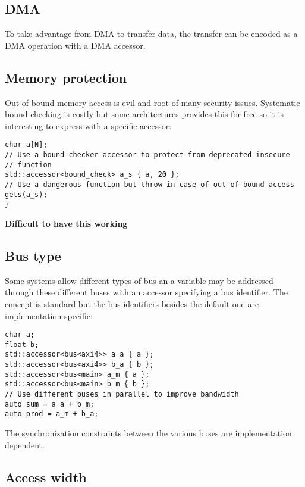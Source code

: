 \documentclass[a4paper]{article}
\begin{document}
\subsection{DMA}
\label{sec:dma}

To take advantage from DMA to transfer data, the transfer can be
encoded as a DMA operation with a DMA accessor.


\subsection{Memory protection}
\label{sec:memory-protection}

Out-of-bound memory access is evil and root of many security
issues. Systematic bound checking is costly but some architectures
provides this for free so it is interesting to express with a specific
accessor:
\begin{lstlisting}
char a[N];
// Use a bound-checker accessor to protect from deprecated insecure
// function
std::accessor<bound_check> a_s { a, 20 };
// Use a dangerous function but throw in case of out-of-bound access
gets(a_s);
}
\end{lstlisting}

\textbf{Difficult to have this working}


\subsection{Bus type}
\label{sec:bus-type}

Some systems allow different types of bus an a variable may be
addressed through these different buses with an accessor specifying a
bus identifier. The concept is standard but the bus identifiers
besides the default one are implementation specific:
\begin{lstlisting}
char a;
float b;
std::accessor<bus<axi4>> a_a { a };
std::accessor<bus<axi4>> b_a { b };
std::accessor<bus<main> a_m { a };
std::accessor<bus<main> b_m { b };
// Use different buses in parallel to improve bandwidth
auto sum = a_a + b_m;
auto prod = a_m + b_a;
\end{lstlisting}

The synchronization constraints between the various buses are
implementation dependent.


\subsection{Access width}
\label{sec:access-width}
\end{document}

